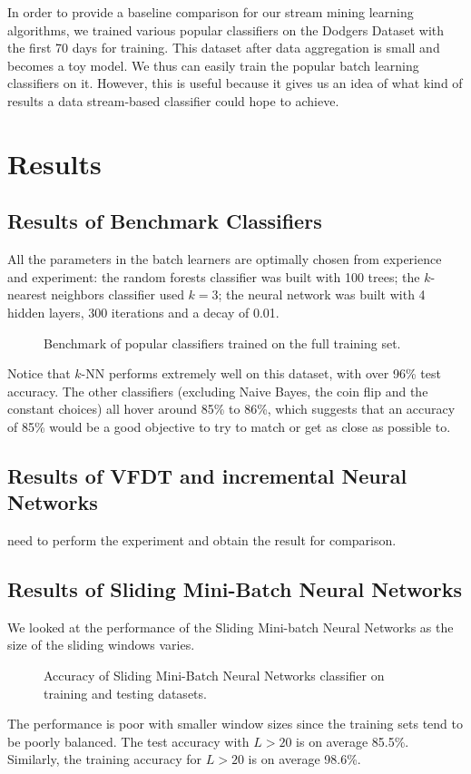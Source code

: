 \documentclass[conference]{IEEEtran}
\begin{document}
In order to provide a baseline comparison for our stream mining learning algorithms, we trained various popular classifiers on the Dodgers Dataset with the first 70 days for training. This dataset after data aggregation is small and becomes a toy model. We thus can easily train the popular batch learning classifiers on it. However, this is useful because it gives us an idea of what kind of results a data stream-based classifier could hope to achieve.

\section{Results}
\label{sec:experiments-and-results}

\subsection{Results of Benchmark Classifiers}
All the parameters in the batch learners are optimally chosen from experience and experiment: the random forests classifier was built with 100 trees; the $k$-nearest neighbors classifier used $k=3$; the neural network was built with 4 hidden layers, 300 iterations and a decay of 0.01.

\begin{figure}[H]
	\centering
	\caption{Benchmark of popular classifiers trained on the full training set.}
	\label{fig:benchmark}
\end{figure}

Notice that $k$-NN performs extremely well on this dataset, with over 96\% test accuracy. The other classifiers (excluding Naive Bayes, the coin flip and the constant choices) all hover around 85\% to 86\%, which suggests that an accuracy of 85\% would be a good objective to try to match or get as close as possible to.

\subsection{Results of VFDT and incremental Neural Networks}
need to perform the experiment and obtain the result for comparison.
\subsection{Results of Sliding Mini-Batch Neural Networks}

We looked at the performance of the Sliding Mini-batch Neural Networks as the size of the sliding windows varies.
\begin{figure}[H]
	\centering
	\caption{Accuracy of Sliding Mini-Batch Neural Networks classifier on training and testing datasets.}
	\label{fig:benchmark}
\end{figure}
The performance is poor with smaller window sizes since the training sets tend to be poorly balanced. The test accuracy with $L > 20$ is on average 85.5\%. Similarly, the training accuracy for $L > 20$ is on average 98.6\%.
\end{document}
